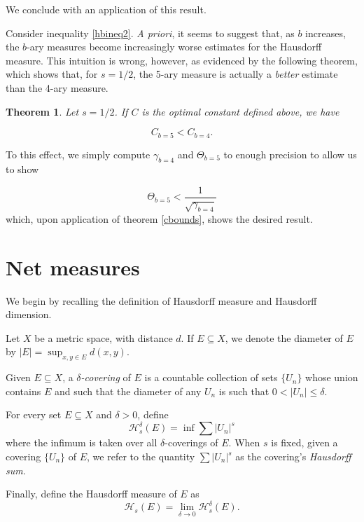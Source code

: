 \documentclass[11pt, reqno]{amsart}
\newcommand{\HH}{\mathcal{H}}
\newtheorem{theorem}{Theorem}
\begin{document}
We conclude with an application of this result.

Consider inequality \eqref{hbineq2}. \emph{A priori}, it seems to suggest that, as $b$ increases, the $b$-ary measures become increasingly worse estimates for the Hausdorff measure. This intuition is wrong, however, as evidenced by the following theorem, which shows that, for $s = 1/2$, the 5-ary measure is actually a \emph{better} estimate than the 4-ary measure.

\begin{theorem}
Let $s = 1/2$. If $C$ is the optimal constant defined above, we have

\[C_{b = 5} < C_{b = 4}.\]
\end{theorem}

To this effect, we simply compute $\gamma_{b = 4}$ and $\Theta_{b = 5}$ to enough precision to allow us to show

\[\Theta_{b = 5} < \frac 1 {\sqrt{\gamma_{b = 4}}}\]
which, upon application of theorem \ref{cbounds}, shows the desired result.

\section{Net measures}

We begin by recalling the definition of Hausdorff measure and Hausdorff dimension.

Let $X$ be a metric space, with distance $d$. If $E \subseteq X$, we denote the diameter of $E$ by $\lvert E \rvert = \sup_{x, y \in E} d(x,y)$.

Given $E \subseteq X$, a \emph{$\delta$-covering} of $E$ is a countable collection of sets $\{U_n\}$ whose union contains $E$ and such that the diameter of any $U_n$ is such that $0 < \lvert U_n \rvert \leq \delta$.

For every set $E \subseteq X$ and $\delta > 0$, define
\begin{equation}\label{hausdorffdeltadef}
\HH_s^\delta(E) = \inf \sum \lvert U_n \rvert^s
\end{equation}
where the infimum is taken over all $\delta$-coverings of $E$. When $s$ is fixed, given a covering $\{U_n\}$ of $E$, we refer to the quantity $\sum \lvert U_n \rvert^s$ as the covering's \emph{Hausdorff sum}.

Finally, define the Hausdorff measure of $E$ as
\begin{equation}\label{hausdorffdef}
\HH_s(E) = \lim_{\delta \to 0} \HH_s^\delta(E).
\end{equation}
\end{document}
